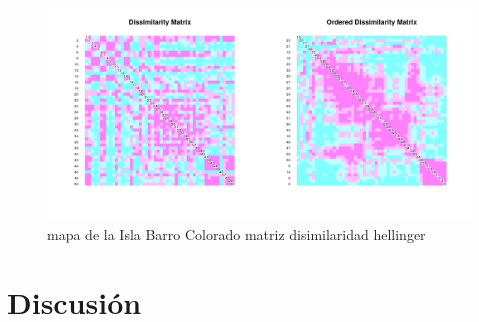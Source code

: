 \documentclass[11pt,]{article}
\begin{document}
\begin{figure}
\centering
\includegraphics[width=1.00000\textwidth]{matriz_disimilaridad_hellinger.png}
\caption{mapa de la Isla Barro Colorado matriz disimilaridad hellinger
\label{fig:bci_map}}
\end{figure}

\section{Discusión}\label{discusiuxf3n}
\end{document}
